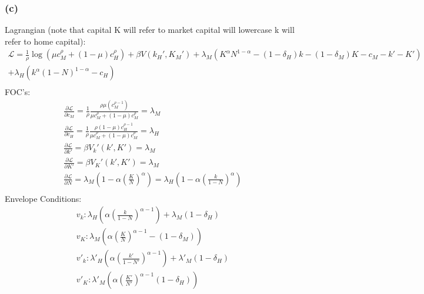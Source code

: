 \documentclass[10pt, a4paper]{article}
\begin{document}
    \subsubsection*{(c)}
      Lagrangian (note that capital K will refer to market capital will lowercase k will refer to home capital):
      \begin{gather*}
        \mathcal{L} = \frac{1}{\rho}\log(\mu c_M^{\rho}+(1-\mu)c_H^{\rho})+\beta V(k_H', K_M') + \lambda_M(K^{\alpha}N^{1-\alpha}-(1-\delta_H)k-(1-\delta_M)K - c_M-k'-K') \\ + \lambda_H(k^{\alpha}(1-N)^{1-\alpha}-c_H) \\
      \end{gather*}
      FOC's: \\
      \begin{gather*}
        \frac{\partial\mathcal{L}}{\partial c_M} = \frac{1}{\rho}\frac{\rho\mu(c_M^{\rho-1})}{\mu c_M^{\rho}+(1-\mu)c_M^{\rho}} = \lambda_M \\
        \frac{\partial\mathcal{L}}{\partial c_H} = \frac{1}{\rho}\frac{\rho(1-\mu)c_H^{\rho-1}}{\mu c_M^{\rho}+(1-\mu)c_M^{\rho}} = \lambda_H \\
        \frac{\partial\mathcal{L}}{\partial k'} = \beta V_k'(k',K') = \lambda_M \\
        \frac{\partial\mathcal{L}}{\partial K'} = \beta V_K'(k',K') = \lambda_M \\
        \frac{\partial\mathcal{L}}{\partial N} = \lambda_M(1-\alpha(\frac{K}{N})^{\alpha}) = \lambda_H(1-\alpha(\frac{k}{1-N})^{\alpha}) \\
      \end{gather*}
      Envelope Conditions: \\
      \begin{gather*}
        v_k: \lambda_H(\alpha(\frac{k}{1-N})^{\alpha-1}) + \lambda_M(1-\delta_H) \\
        v_K: \lambda_M(\alpha(\frac{K}{N})^{\alpha-1}-(1-\delta_M)) \\
        v'_k: \lambda'_H(\alpha(\frac{k'}{1-N'})^{\alpha-1}) + \lambda'_M(1-\delta_H) \\
        v'_K: \lambda'_M(\alpha(\frac{K'}{N'})^{\alpha-1}(1-\delta_H)) \\
      \end{gather*}
\end{document}
